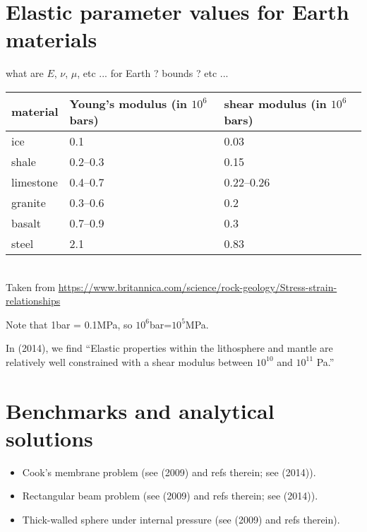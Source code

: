 \newpage
\section{Elastic parameter values for Earth materials}


what are $E$, $\nu$, $\mu$, etc ... for Earth ? bounds ? etc ...

\begin{center}
\begin{tabular}{lll}
\hline
material & Young's modulus (in $10^6$ bars) &	shear modulus (in $10^6$ bars)  \\
\hline\hline
ice &	0.1 &	0.03\\
shale &	0.2–0.3 	& 0.15\\
limestone &	0.4–0.7 &	0.22–0.26\\
granite &	0.3–0.6 &	0.2\\
basalt &	0.7–0.9 &	0.3\\
steel &	2.1 &	0.83 \\
\hline
\end{tabular}\\
{\captionfont Taken from 
\url{https://www.britannica.com/science/rock-geology/Stress-strain-relationships}}
\end{center}

Note that 1bar = 0.1MPa, so $10^6$bar=$10^5$MPa.

In \textcite{famc14} (2014), we find ``Elastic properties within the 
lithosphere and mantle are relatively well constrained with a shear 
modulus between $10^{10}$ and $10^{11}$ Pa.''


\section{Benchmarks and analytical solutions}

\begin{itemize}
\item Cook's membrane problem (see \textcite{lami09} (2009) and refs therein; 
see \textcite{lami14} (2014)).
\item Rectangular beam problem (see \textcite{lami09} (2009) and refs therein; 
see \textcite{lami14} (2014)).
\item Thick-walled sphere under internal pressure (see \textcite{lami09} (2009) and refs therein).
\end{itemize}

